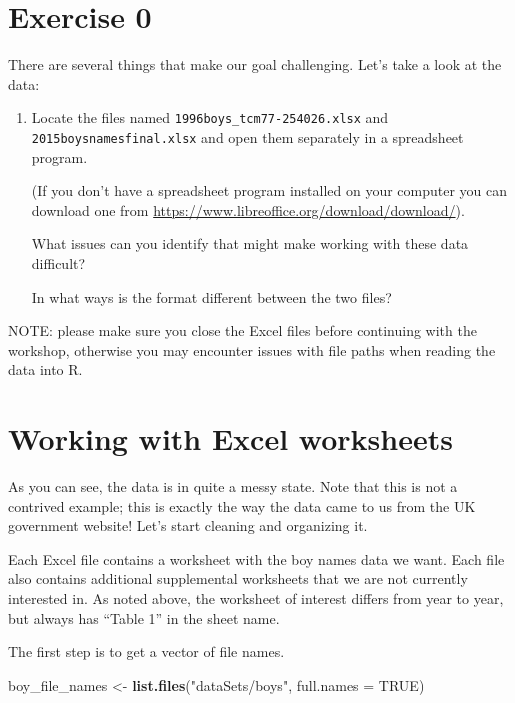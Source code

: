 \documentclass[]{book}
\newenvironment{Shaded}{\begin{snugshade}}{\end{snugshade}}
\newcommand{\KeywordTok}[1]{\textcolor[rgb]{0.13,0.29,0.53}{\textbf{#1}}}
\newcommand{\DataTypeTok}[1]{\textcolor[rgb]{0.13,0.29,0.53}{#1}}
\newcommand{\StringTok}[1]{\textcolor[rgb]{0.31,0.60,0.02}{#1}}
\newcommand{\OtherTok}[1]{\textcolor[rgb]{0.56,0.35,0.01}{#1}}
\newcommand{\NormalTok}[1]{#1}
\begin{document}
\section{Exercise 0}\label{exercise-0-3}

There are several things that make our goal challenging. Let's take a
look at the data:

\begin{enumerate}
\def\labelenumi{\arabic{enumi}.}
\item
  Locate the files named \texttt{1996boys\_tcm77-254026.xlsx} and
  \texttt{2015boysnamesfinal.xlsx} and open them separately in a
  spreadsheet program.

  (If you don't have a spreadsheet program installed on your computer
  you can download one from
  \url{https://www.libreoffice.org/download/download/}).

  What issues can you identify that might make working with these data
  difficult?

  In what ways is the format different between the two files?
\end{enumerate}

NOTE: please make sure you close the Excel files before continuing with
the workshop, otherwise you may encounter issues with file paths when
reading the data into R.

\section{Working with Excel
worksheets}\label{working-with-excel-worksheets}

As you can see, the data is in quite a messy state. Note that this is
not a contrived example; this is exactly the way the data came to us
from the UK government website! Let's start cleaning and organizing it.

Each Excel file contains a worksheet with the boy names data we want.
Each file also contains additional supplemental worksheets that we are
not currently interested in. As noted above, the worksheet of interest
differs from year to year, but always has ``Table 1'' in the sheet name.

The first step is to get a vector of file names.

\begin{Shaded}
\begin{Highlighting}[]
\NormalTok{boy_file_names <-}\StringTok{ }\KeywordTok{list.files}\NormalTok{(}\StringTok{"dataSets/boys"}\NormalTok{, }\DataTypeTok{full.names =} \OtherTok{TRUE}\NormalTok{)}
\end{Highlighting}
\end{Shaded}
\end{document}
